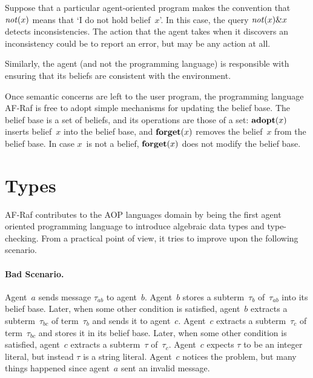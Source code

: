 \documentclass[a4paper,12pt,oneside,fleqn]{book} %
\newcommand{\rg}[1]{\marginpar{\tiny\raggedright\textcolor{blue}{\bf rg:} #1}}
\renewcommand{\rg}{}
\begin{document}
\begin{example} Suppose that a particular agent-oriented program makes the
convention that ${\it not}(x)$ means that `I do not hold belief~$x$'.  In
this case, the query ${\it not}(x)\&x$ detects inconsistencies.  The action
that the agent takes when it discovers an inconsistency could be to report
an error, but may be any action at all.  \end{example}

Similarly, the agent (and not the programming language) is responsible with
ensuring that its beliefs are consistent with the environment.

Once semantic concerns are left to the user program, the programming
language AF-Raf is free to adopt simple mechanisms for updating the belief
base.  The belief base is a set of beliefs, and its operations are those of
a set:  ${\bf adopt}(x)$ inserts belief~$x$ into the belief base, and ${\bf
forget}(x)$ removes the belief~$x$ from the belief base.  In case $x$~is
not a belief, ${\bf forget}(x)$ does not modify the belief base.

\section{Types}\label{sec:types} %

AF-Raf contributes to the AOP languages domain by being the first agent
oriented programming language to introduce algebraic data types and
type-checking. From a practical point of view, it tries to improve
upon the following scenario.

\paragraph{Bad Scenario.}

Agent~$a$ sends message $\tau_{ab}$ to agent~$b$. Agent~$b$ stores a
subterm~$\tau_b$ of~$\tau_{ab}$ into its belief base. Later, when some
other condition is satisfied, agent~$b$ extracts a subterm~$\tau_{bc}$ of
term~$\tau_b$ and sends it to agent~$c$. Agent~$c$ extracts a
subterm~$\tau_c$ of term~$\tau_{bc}$ and stores it in its belief base.
Later, when some other condition is satisfied, agent~$c$ extracts a
subterm~$\tau$ of~$\tau_c$. Agent~$c$ expects $\tau$ to be an integer
literal, but instead $\tau$ is a string literal. Agent~$c$ notices the
problem, but many things happened since agent~$a$ sent an invalid message.
\end{document}
